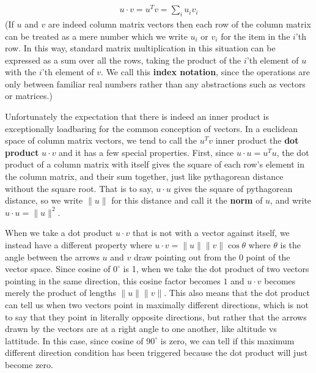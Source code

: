 \documentclass[11pt]{article}
\begin{document}
\begin{gather*}
u \cdot v = u^T v = \sum_{i} u_i v_i
\end{gather*}
(If $u$ and $v$ are indeed column matrix vectors then each row of the column matrix can be treated as a mere number which we write $u_i$ or $v_i$ for the item in the $i$'th row. In this way, standard matrix multiplication in this situation can be expressed as a sum over all the rows, taking the product of the $i$'th element of $u$ with the $i$'th element of $v$. We call this \textbf{index notation}, since the operations are only between familiar real numbers rather than any abstractions such as vectors or matrices.)

Unfortunately the expectation that there is indeed an inner product is exceptionally loadbaring for the common conception of vectors. In a euclidean space of column matrix vectors, we tend to call the $u^T v$ inner product the \textbf{dot product} $u \cdot v$ and it has a few special properties. First, since $u \cdot u = u^T u$, the dot product of a column matrix with itself gives the square of each row's element in the column matrix, and their sum together, just like pythagorean distance without the square root. That is to say, $u \cdot u$ gives the square of pythagorean distance, so we write $\lVert u \rVert$ for this distance and call it the \textbf{norm} of $u$, and write $u \cdot u = \lVert u \rVert^2$.

When we take a dot product $u \cdot v$ that is not with a vector against itself, we instead have a different property where $u \cdot v = \lVert u \rVert \lVert v \rVert \cos \theta$ where $\theta$ is the angle between the arrows $u$ and $v$ draw pointing out from the $0$ point of the vector space. Since cosine of $0^\circ$ is 1, when we take the dot product of two vectors pointing in the same direction, this cosine factor becomes $1$ and $u\cdot v$ becomes merely the product of lengths $\lVert u \rVert \lVert v \rVert$. This also means that the dot product can tell us when two vectors point in maximally different directions, which is not to say that they point in literally opposite directions, but rather that the arrows drawn by the vectors are at a right angle to one another, like altitude vs lattitude. In this case, since cosine of $90^\circ$ is zero, we can tell if this maximum different direction condition has been triggered because the dot product will just become zero.
\end{document}
